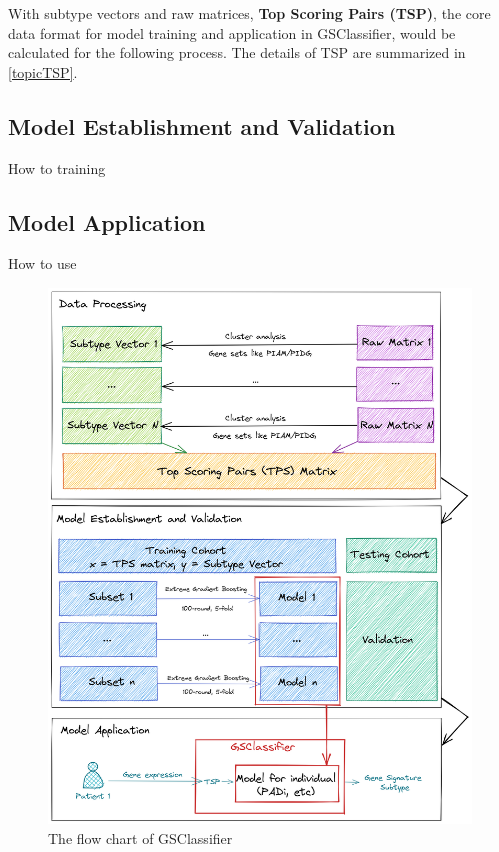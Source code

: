 \documentclass[
  12pt,
]{book}
\begin{document}
With subtype vectors and raw matrices, \textbf{Top Scoring Pairs (TSP)}, the core data format for model training and application in GSClassifier, would be calculated for the following process. The details of TSP are summarized in \ref{topicTSP}.

\hypertarget{model-establishment-and-validation}{%
\subsection{Model Establishment and Validation}\label{model-establishment-and-validation}}

How to training

\hypertarget{model-application}{%
\subsection{Model Application}\label{model-application}}

How to use

\begin{figure}

{\centering \includegraphics[width=0.9\linewidth]{./fig/flowchart} 

}

\caption{The flow chart of GSClassifier}\label{fig:flowchart}
\end{figure}
\end{document}
